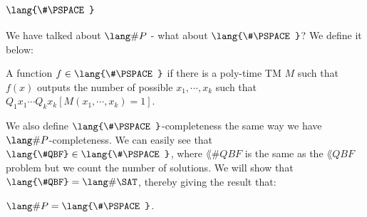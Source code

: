 \newcommand{\SharpPSPACE}{\lang{\#\PSPACE}}
\subsection{$\SharpPSPACE$}
We have talked about $\SharpP$ - what about $\SharpPSPACE$? We define it below:
\begin{definition}
A function $f \in \SharpPSPACE$ if there is a poly-time TM $M$ such that $f(x)$ outputs the number of possible $x_1, \cdots, x_k$ such that $Q_1x_1 \cdots Q_kx_k [M(x_1, \cdots, x_k) = 1]$. 
\end{definition}
\newcommand{\SharpQBF}{\lang{\#QBF}}
We also define $\SharpPSPACE$-completeness the same way we have $\SharpP$-completeness. We can easily see that $\SharpQBF \in \SharpPSPACE$, where $\SharpQBF$ is the same as the $\lang{QBF}$ problem but we count the number of solutions. We will show that $\SharpQBF = \SharpSAT$, thereby giving the result that:
\begin{theorem}
$\SharpP = \SharpPSPACE$.
\end{theorem}

